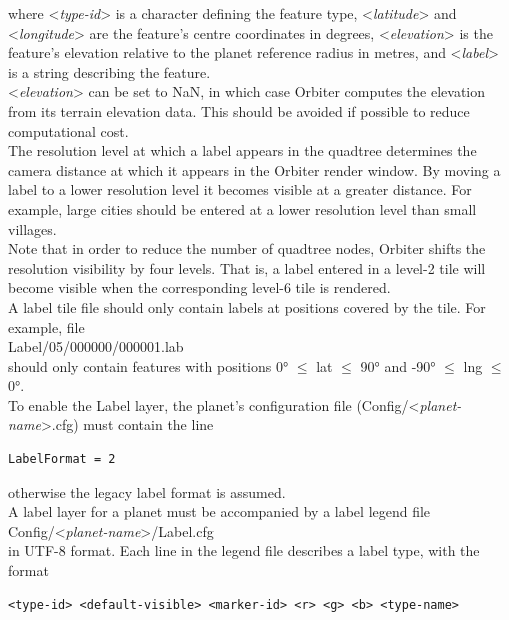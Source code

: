 \documentclass[Orbiter Developer Manual.tex]{subfiles}
\begin{document}
\noindent
where <\textit{type-id}> is a character defining the feature type, <\textit{latitude}> and <\textit{longitude}> are the feature's centre coordinates in degrees, <\textit{elevation}> is the feature's elevation relative to the planet reference radius in metres, and <\textit{label}> is a string describing the feature.\\
<\textit{elevation}> can be set to NaN, in which case Orbiter computes the elevation from its terrain elevation data. This should be avoided if possible to reduce computational cost.\\
The resolution level at which a label appears in the quadtree determines the camera distance at which it appears in the Orbiter render window. By moving a label to a lower resolution level it becomes visible at a greater distance. For example, large cities should be entered at a lower resolution level than small villages.\\
Note that in order to reduce the number of quadtree nodes, Orbiter shifts the resolution visibility by four levels. That is, a label entered in a level-2 tile will become visible when the corresponding level-6 tile is rendered.\\
A label tile file should only contain labels at positions covered by the tile. For example, file\\
\indent Label/05/000000/000001.lab\\
should only contain features with positions 0° $\leq$ lat $\leq$ 90° and -90° $\leq$ lng $\leq$ 0°.\\
To enable the Label layer, the planet's configuration file (Config/<\textit{planet-name}>.cfg) must contain the line

\begin{lstlisting}[language=OSFS]
LabelFormat = 2
\end{lstlisting}

\noindent
otherwise the legacy label format is assumed.\\
A label layer for a planet must be accompanied by a label legend file\\
\indent Config/<\textit{planet-name}>/Label.cfg\\
in UTF-8 format. Each line in the legend file describes a label type, with the format

\begin{lstlisting}[language=OSFS]
<type-id> <default-visible> <marker-id> <r> <g> <b> <type-name>
\end{lstlisting}
\end{document}
